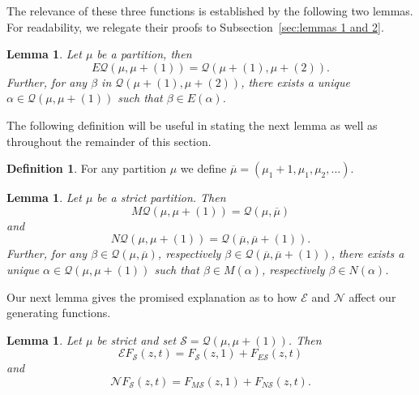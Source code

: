 \documentclass{article}
\theoremstyle{plain}
\newtheorem{lemma}[theorem]{Lemma}
\theoremstyle{definition}
\newtheorem{definition}[theorem]{Definition}
\newcommand{\N}{\mathcal{N}}
\newcommand{\E}{\mathcal{E}}
\newcommand{\Q}{\mathcal{Q}}
\renewcommand{\S}{\mathcal{S}}
\renewcommand{\ne}[1]{\overline{#1}}
\begin{document}
The relevance of these three functions is established by the following two lemmas.  For readability, we relegate their proofs to Subsection~\ref{sec:lemmas 1 and 2}.



\begin{lemma}\label{lem:E}
	Let $\mu$ be a partition, then 
\begin{equation}\label{eq:E}
E\Q(\mu, \mu+(1)) = \Q(\mu+(1),\mu+(2)).	
\end{equation}
	Further, for any $\beta$ in $\Q(\mu+(1), \mu+(2))$, there exists a unique $\alpha \in \Q(\mu, \mu+(1))$ such that $\beta \in E(\alpha)$.  
\end{lemma}


The following definition will be useful in stating the next lemma as well as throughout the remainder of this section.

\begin{definition}
	For any partition $\mu$ we define $\ne{\mu} = (\mu_1+1,\mu_1,\mu_2,\ldots)$.  
\end{definition}

\begin{lemma}\label{lem:N}
	Let $\mu$ be a strict partition.  Then 
\begin{equation}\label{eq:M}
M\Q(\mu,\mu+(1)) =  \Q(\mu,\ne\mu)
\end{equation}
and 
\begin{equation}\label{eq:N}
N\Q(\mu,\mu+(1)) =  \Q(\ne\mu,\ne\mu+(1)).
\end{equation}
Further, for any $\beta\in\Q(\mu,\ne\mu)$, respectively $\beta \in \Q(\ne\mu,\ne\mu+(1))$, there exists a unique $\alpha \in \Q(\mu,\mu+(1))$ such that $\beta \in M(\alpha)$, respectively $\beta \in N(\alpha)$.    
\end{lemma}



Our next lemma gives the promised explanation as to how $\E$ and $\N$ affect our generating functions. 

\begin{lemma}\label{lem:GF and E/N}
	Let $\mu$ be strict and set $\S = \Q(\mu, \mu+(1))$.  Then
	\begin{equation}\label{eq:scriptE/E}
	  \E F_{\S}(z,t) = F_{\S}(z,1) + F_{E\S}(z,t)  
	\end{equation}
and 
\begin{equation}\label{eq:scriptN/N}
    \N F_{\S}(z,t) = F_{M\S}(z,1) + F_{N\S}(z,t).
\end{equation}
\end{lemma}
\end{document}
